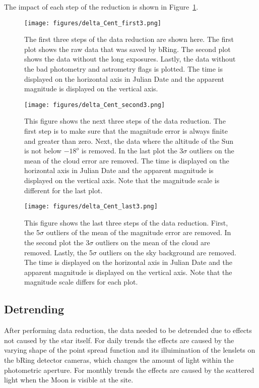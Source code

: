 \documentclass{aa}
\begin{document}
The impact of each step of the reduction is shown in Figure~\ref{deltaCen1}.

\begin{figure}
    \centering
    \texttt{[image: figures/delta\_Cent\_first3.png]}
    \caption{The first three steps of the data reduction are shown here. The first plot shows the raw data that was saved by bRing. The second plot shows the data without the long exposures. Lastly, the data without the bad photometry and astrometry flags is plotted. The time is displayed on the horizontal axis in Julian Date and the apparent magnitude is displayed on the vertical axis.}
    \label{deltaCen1}
\end{figure}
\begin{figure}
    \centering
    \texttt{[image: figures/delta\_Cent\_second3.png]}
    \caption{This figure shows the next three steps of the data reduction. The first step is to make sure that the magnitude error is always finite and greater than zero. Next, the data where the altitude of the Sun is not below $-18^o$ is removed. In the last plot the 3$\sigma$ outliers on the mean of the cloud error are removed. The time is displayed on the horizontal axis in Julian Date and the apparent magnitude is displayed on the vertical axis. Note that the magnitude scale is different for the last plot.}
    \label{deltaCen2}
\end{figure}
\begin{figure}
    \centering
    \texttt{[image: figures/delta\_Cent\_last3.png]}
    \caption{This figure shows the last three steps of the data reduction. First, the 5$\sigma$ outliers of the mean of the magnitude error are removed. In the second plot the 3$\sigma$ outliers on the mean of the cloud are removed. Lastly, the 5$\sigma$ outliers on the sky background are removed. The time is displayed on the horizontal axis in Julian Date and the apparent magnitude is displayed on the vertical axis. Note that the magnitude scale differs for each plot.}
    \label{deltaCen3}
\end{figure}


\subsection{Detrending}

After performing data reduction, the data needed to be detrended due to effects not caused by the star itself.
%
For daily trends the effects are caused by the varying shape of the point spread function and its illuimination of the lenslets on the bRing detector cameras, which changes the amount of light within the photometric aperture.
%
For monthly trends the effects are caused by the scattered light when the Moon is visible at the site.
\end{document}
